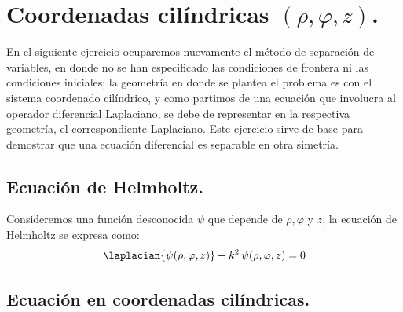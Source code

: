 
\section{Coordenadas cilíndricas \texorpdfstring{$(\rho, \varphi, z)$}{(r, v, z)}.}

En el siguiente ejercicio ocuparemos nuevamente el método de separación de variables, en donde no se han especificado las condiciones de frontera ni las condiciones iniciales; la geometría en donde se plantea el problema es con el sistema coordenado cilíndrico, y como partimos de una ecuación que involucra al operador diferencial Laplaciano, se debe de representar en la respectiva geometría, el correspondiente Laplaciano. Este ejercicio sirve de base para demostrar que una ecuación diferencial es separable en otra simetría.

\subsection{Ecuación de Helmholtz.}

Consideremos una función desconocida $\psi$ que depende de $\rho, \varphi$ y $z$, la ecuación de Helmholtz se expresa como:
\begin{align}
\laplacian{\psi (\rho, \varphi, z)} + k^{2} \, \psi (\rho, \varphi, z) = 0
\label{eq:ecuacion_09_45}    
\end{align}

\subsection{Ecuación en coordenadas cilíndricas.}

